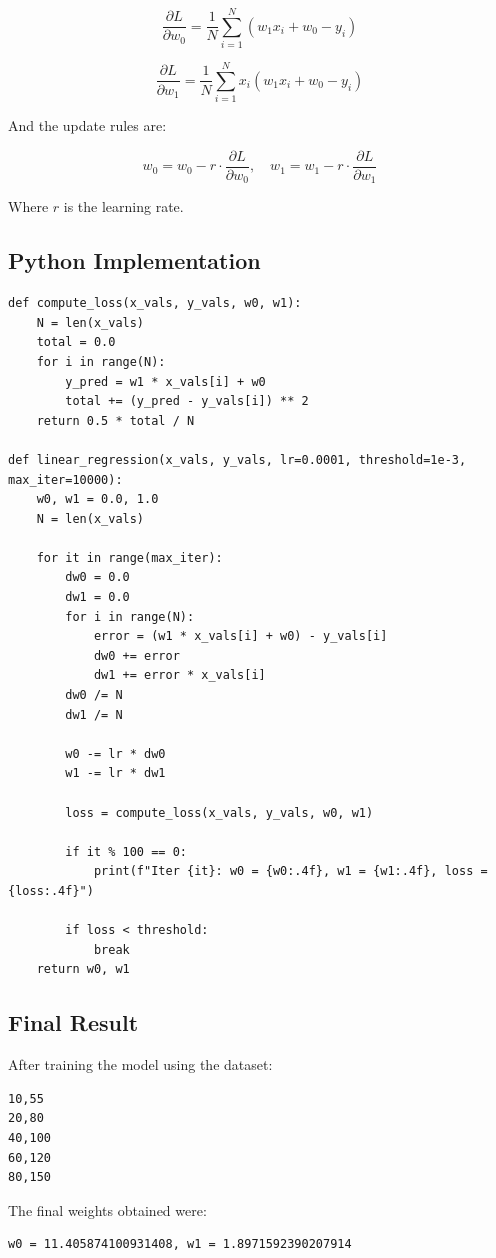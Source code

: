 \documentclass[12pt]{article}
\begin{document}
\[
\frac{\partial L}{\partial w_0} = \frac{1}{N} \sum_{i=1}^N (w_1 x_i + w_0 - y_i)
\]

\[
\frac{\partial L}{\partial w_1} = \frac{1}{N} \sum_{i=1}^N x_i (w_1 x_i + w_0 - y_i)
\]

And the update rules are:

\[
w_0 = w_0 - r \cdot \frac{\partial L}{\partial w_0}, \quad w_1 = w_1 - r \cdot \frac{\partial L}{\partial w_1}
\]

Where $r$ is the learning rate.

\subsection{Python Implementation}

\begin{verbatim}
def compute_loss(x_vals, y_vals, w0, w1):
    N = len(x_vals)
    total = 0.0
    for i in range(N):
        y_pred = w1 * x_vals[i] + w0
        total += (y_pred - y_vals[i]) ** 2
    return 0.5 * total / N

def linear_regression(x_vals, y_vals, lr=0.0001, threshold=1e-3, max_iter=10000):
    w0, w1 = 0.0, 1.0
    N = len(x_vals)

    for it in range(max_iter):
        dw0 = 0.0
        dw1 = 0.0
        for i in range(N):
            error = (w1 * x_vals[i] + w0) - y_vals[i]
            dw0 += error
            dw1 += error * x_vals[i]
        dw0 /= N
        dw1 /= N

        w0 -= lr * dw0
        w1 -= lr * dw1

        loss = compute_loss(x_vals, y_vals, w0, w1)

        if it % 100 == 0:
            print(f"Iter {it}: w0 = {w0:.4f}, w1 = {w1:.4f}, loss = {loss:.4f}")

        if loss < threshold:
            break
    return w0, w1
\end{verbatim}

\subsection{Final Result}
After training the model using the dataset:

\begin{verbatim}
10,55
20,80
40,100
60,120
80,150
\end{verbatim}

\noindent 
The final weights obtained were:

\begin{verbatim}
w0 = 11.405874100931408, w1 = 1.8971592390207914
\end{verbatim}
\end{document}
